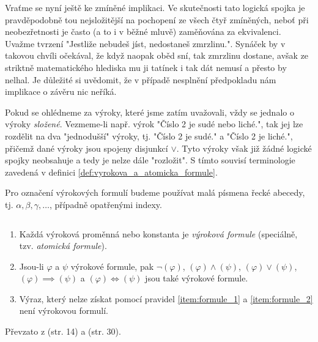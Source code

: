 Vraťme se nyní ještě ke zmíněné implikaci. Ve skutečnosti tato logická spojka je pravděpodobně tou nejsložitější na pochopení ze všech čtyř zmíněných, neboť při neobezřetnosti je často (a to i v běžné mluvě) zaměňována za ekvivalenci. Uvažme tvrzení "Jestliže nebudeš jíst, nedostaneš zmrzlinu.". Synáček by v takovou chvíli očekával, že když naopak oběd sní, tak zmrzlinu dostane, avšak ze striktně matematického hlediska mu ji tatínek i tak dát nemusí a přesto by nelhal. Je důležité si uvědomit, že v případě nesplnění předpokladu nám implikace o závěru nic neříká.\par

Pokud se ohlédneme za výroky, které jsme zatím uvažovali, vždy se jednalo o výroky \emph{složené}. Vezmeme-li např. výrok "Číslo 2 je sudé nebo liché.", tak jej lze rozdělit na dva "jednodušší" výroky, tj. "Číslo 2 je sudé." a "Číslo 2 je liché.", přičemž dané výroky jsou spojeny disjunkcí $\lor$. Tyto výroky však již žádné logické spojky neobsahuje a tedy je nelze dále "rozložit". S tímto souvisí terminologie zavedená v definici \ref{def:vyrokova_a_atomicka_formule}.
\needspace{1em}

\begin{convention}
    Pro označení výrokových formulí budeme používat malá písmena řecké abecedy, tj. $\alpha,\beta,\gamma,\ldots$, případně opatřenými indexy.
\end{convention}

\begin{definition}\label{def:vyrokova_a_atomicka_formule}
    $ $\par
    \begin{enumerate}[label=(\roman*)]
        \item\label{item:formule_1} Každá výroková proměnná nebo konstanta je \emph{výroková formule} (speciálně, tzv. \emph{atomická formule}).
        \item\label{item:formule_2} Jsou-li $\varphi$ a $\psi$ výrokové formule, pak $\neg (\varphi)$, $(\varphi) \land (\psi)$, $(\varphi) \lor (\psi)$, $(\varphi) \implies (\psi)$ a $(\varphi) \iff (\psi)$ jsou také výrokové formule.
        \item\label{item:formule_3} Výraz, který nelze získat pomocí pravidel \ref{item:formule_1} a \ref{item:formule_2} není výrokovou formulí.
    \end{enumerate}
\end{definition}
Převzato z \cite{Fuchs2003} (str. 14) a \cite{BalcarStepanek1986} (str. 30).

